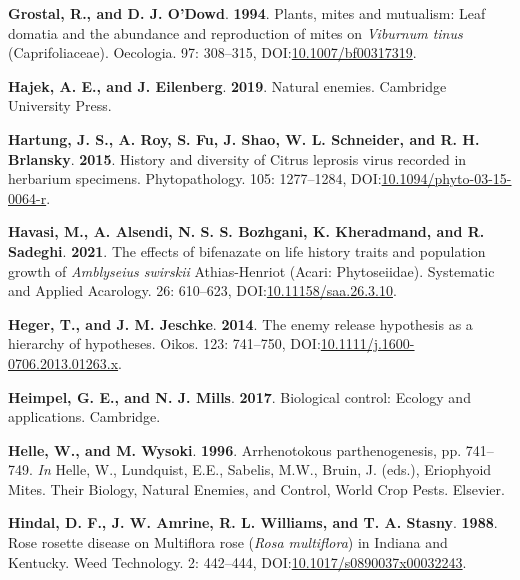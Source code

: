 \documentclass[12pt,final,CPage]{ufthesis}
\newlength{\cslhangindent}
\newenvironment{CSLReferences}[2] %
{%
	\setlength{\parindent}{0pt}
	\ifodd #1 \everypar{\setlength{\hangindent}{\cslhangindent}}\ignorespaces\fi
	\ifnum #2 > 0
	\setlength{\parskip}{#2\baselineskip}
	\fi
}%
{}
\begin{document}
{\begin{CSLReferences}{1}{0}
  \leavevmode{}%
  \textbf{Grostal, R., and D. J. O'Dowd}. \textbf{1994}. Plants, mites and mutualism: Leaf domatia and the abundance and reproduction of mites on {\emph{Viburnum tinus}} ({Caprifoliaceae}). Oecologia. 97: 308--315, DOI:\href{https://doi.org/10.1007/bf00317319}{10.1007/bf00317319}.

  \leavevmode{}%
  \textbf{Hajek, A. E., and J. Eilenberg}. \textbf{2019}. Natural enemies. Cambridge University Press.

  \leavevmode{}%
  \textbf{Hartung, J. S., A. Roy, S. Fu, J. Shao, W. L. Schneider, and R. H. Brlansky}. \textbf{2015}. History and diversity of {Citrus leprosis virus} recorded in herbarium specimens. Phytopathology{\textregistered}. 105: 1277--1284, DOI:\href{https://doi.org/10.1094/phyto-03-15-0064-r}{10.1094/phyto-03-15-0064-r}.

  \leavevmode{}%
  \textbf{Havasi, M., A. Alsendi, N. S. S. Bozhgani, K. Kheradmand, and R. Sadeghi}. \textbf{2021}. The effects of bifenazate on life history traits and population growth of {\emph{Amblyseius swirskii}} {Athias-Henriot} ({Acari}: {Phytoseiidae}). Systematic and Applied Acarology. 26: 610--623, DOI:\href{https://doi.org/10.11158/saa.26.3.10}{10.11158/saa.26.3.10}.

  \leavevmode{}%
  \textbf{Heger, T., and J. M. Jeschke}. \textbf{2014}. The enemy release hypothesis as a hierarchy of hypotheses. Oikos. 123: 741--750, DOI:\href{https://doi.org/10.1111/j.1600-0706.2013.01263.x}{10.1111/j.1600-0706.2013.01263.x}.

  \leavevmode{}%
  \textbf{Heimpel, G. E., and N. J. Mills}. \textbf{2017}. Biological control: Ecology and applications. Cambridge.

  \leavevmode{}%
  \textbf{Helle, W., and M. Wysoki}. \textbf{1996}. Arrhenotokous parthenogenesis, pp. 741--749. \emph{In} Helle, W., Lundquist, E.E., Sabelis, M.W., Bruin, J. (eds.), Eriophyoid Mites. Their Biology, Natural Enemies, and Control, World Crop Pests. Elsevier.

  \leavevmode{}%
  \textbf{Hindal, D. F., J. W. Amrine, R. L. Williams, and T. A. Stasny}. \textbf{1988}. {Rose rosette disease} on {Multiflora rose} ({\emph{Rosa multiflora}}) in {Indiana} and {Kentucky}. Weed Technology. 2: 442--444, DOI:\href{https://doi.org/10.1017/s0890037x00032243}{10.1017/s0890037x00032243}.


\end{CSLReferences}}
\end{document}
